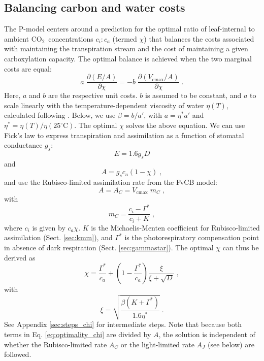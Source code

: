 \documentclass[gmd, manuscript]{copernicus}
\newcommand{\coo}{CO$_2$}
\begin{document}
\subsection{Balancing carbon and water costs}
\label{sec:watercarbon}
The P-model centers around a prediction for the optimal ratio of leaf-internal to ambient \coo\ concentrations $c_i:c_a$ (termed $\chi$) that balances the costs associated with maintaining the transpiration stream and the cost of maintaining a given carboxylation capacity. The optimal balance is achieved when the two marginal costs are equal: 
\begin{equation}
\label{eq:optimality_chi}
a \; \frac{\partial (E/A)}{\partial \chi} = -b \; \frac{\partial (V_{\mathrm{cmax}}/A)}{\partial \chi}\;.
\end{equation}
Here, $a$ and $b$ are the respective unit costs. $b$ is assumed to be constant, and $a$ to scale linearly with the temperature-dependent viscosity of water $\eta(T)$, calculated following \citet{huber09}. Below, we use $\beta = b / a'$, with $a = \eta^\ast a'$ and $\eta^\ast = \eta(T) / \eta(25^{\circ}\text{C})$. The optimal $\chi$ solves the above equation. We can use Fick's law \citep{fick1855} to express transpiration and assimilation as a function of stomatal conductance $g_s$: 
\begin{equation}
\label{eq:egs}
    E = 1.6 g_s D
\end{equation}
and 
\begin{equation}
\label{eq:ags}
    A = g_s c_a (1-\chi) \;,
\end{equation}
and use the Rubisco-limited assimilation rate from the FvCB model:
\begin{equation}
\label{eq:ac}
    A = A_C = V_{\mathrm{cmax}} \; m_C \;,
\end{equation}
with
\begin{equation}
\label{eq:mc}
   m_C = \frac{c_i - \Gamma^{\ast}}{c_i + K}\;,
\end{equation}
where $c_i$ is given by $c_a \chi$. $K$ is the Michaelis-Menten coefficient for Rubisco-limited assimilation (Sect. \ref{sec:kmm}), and $\Gamma^{\ast}$ is the photorespiratory compensation point in absence of dark respiration (Sect. \ref{sec:gammastar}). The optimal $\chi$ can thus be derived as
\begin{equation}
\label{eq:chiopt}
\chi = \frac{\Gamma^{\ast}}{c_a} + \left(1- \frac{\Gamma^{\ast}}{c_a}\right) \frac{\xi}{\xi + \sqrt{D}}\;,
\end{equation}
with 
\begin{equation}
\label{eq:xi}
\xi = \sqrt{\frac{\beta (K+\Gamma^{\ast})}{1.6 \eta^{\ast}}}\;.
\end{equation}
See Appendix \ref{sec:steps_chi} for intermediate steps. Note that because both terms in Eq. \ref{eq:optimality_chi} are divided by $A$, the solution is independent of whether the Rubisco-limited rate $A_C$ or the light-limited rate $A_J$ (see below) are followed. 
\end{document}
